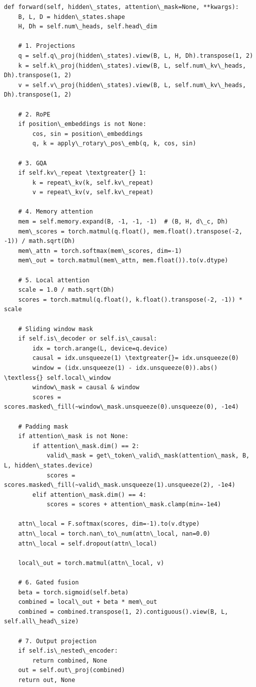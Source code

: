 \begin{lstlisting}
def forward(self, hidden\_states, attention\_mask=None, **kwargs):
    B, L, D = hidden\_states.shape
    H, Dh = self.num\_heads, self.head\_dim
    
    # 1. Projections
    q = self.q\_proj(hidden\_states).view(B, L, H, Dh).transpose(1, 2)
    k = self.k\_proj(hidden\_states).view(B, L, self.num\_kv\_heads, Dh).transpose(1, 2)
    v = self.v\_proj(hidden\_states).view(B, L, self.num\_kv\_heads, Dh).transpose(1, 2)
    
    # 2. RoPE
    if position\_embeddings is not None:
        cos, sin = position\_embeddings
        q, k = apply\_rotary\_pos\_emb(q, k, cos, sin)
    
    # 3. GQA
    if self.kv\_repeat \textgreater{} 1:
        k = repeat\_kv(k, self.kv\_repeat)
        v = repeat\_kv(v, self.kv\_repeat)
    
    # 4. Memory attention
    mem = self.memory.expand(B, -1, -1, -1)  # (B, H, d\_c, Dh)
    mem\_scores = torch.matmul(q.float(), mem.float().transpose(-2, -1)) / math.sqrt(Dh)
    mem\_attn = torch.softmax(mem\_scores, dim=-1)
    mem\_out = torch.matmul(mem\_attn, mem.float()).to(v.dtype)
    
    # 5. Local attention
    scale = 1.0 / math.sqrt(Dh)
    scores = torch.matmul(q.float(), k.float().transpose(-2, -1)) * scale
    
    # Sliding window mask
    if self.is\_decoder or self.is\_causal:
        idx = torch.arange(L, device=q.device)
        causal = idx.unsqueeze(1) \textgreater{}= idx.unsqueeze(0)
        window = (idx.unsqueeze(1) - idx.unsqueeze(0)).abs() \textless{} self.local\_window
        window\_mask = causal & window
        scores = scores.masked\_fill(~window\_mask.unsqueeze(0).unsqueeze(0), -1e4)
    
    # Padding mask
    if attention\_mask is not None:
        if attention\_mask.dim() == 2:
            valid\_mask = get\_token\_valid\_mask(attention\_mask, B, L, hidden\_states.device)
            scores = scores.masked\_fill(~valid\_mask.unsqueeze(1).unsqueeze(2), -1e4)
        elif attention\_mask.dim() == 4:
            scores = scores + attention\_mask.clamp(min=-1e4)
    
    attn\_local = F.softmax(scores, dim=-1).to(v.dtype)
    attn\_local = torch.nan\_to\_num(attn\_local, nan=0.0)
    attn\_local = self.dropout(attn\_local)
    
    local\_out = torch.matmul(attn\_local, v)
    
    # 6. Gated fusion
    beta = torch.sigmoid(self.beta)
    combined = local\_out + beta * mem\_out
    combined = combined.transpose(1, 2).contiguous().view(B, L, self.all\_head\_size)
    
    # 7. Output projection
    if self.is\_nested\_encoder:
        return combined, None
    out = self.out\_proj(combined)
    return out, None
\end{lstlisting}

